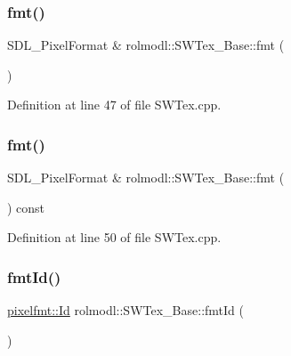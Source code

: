 \subsubsection{\texorpdfstring{fmt()}{fmt()}\hspace{0.1cm}{\footnotesize\ttfamily [1/2]}}
{\footnotesize\ttfamily S\+D\+L\+\_\+\+Pixel\+Format \& rolmodl\+::\+S\+W\+Tex\+\_\+\+Base\+::fmt (\begin{DoxyParamCaption}{ }\end{DoxyParamCaption})\hspace{0.3cm}{\ttfamily [noexcept]}}



Definition at line 47 of file S\+W\+Tex.\+cpp.

\mbox{\label{classrolmodl_1_1_s_w_tex___base_ac8021c7296e412b61f86e86465692213}} 
\subsubsection{\texorpdfstring{fmt()}{fmt()}\hspace{0.1cm}{\footnotesize\ttfamily [2/2]}}
{\footnotesize\ttfamily S\+D\+L\+\_\+\+Pixel\+Format \& rolmodl\+::\+S\+W\+Tex\+\_\+\+Base\+::fmt (\begin{DoxyParamCaption}{ }\end{DoxyParamCaption}) const\hspace{0.3cm}{\ttfamily [noexcept]}}



Definition at line 50 of file S\+W\+Tex.\+cpp.

\mbox{\label{classrolmodl_1_1_s_w_tex___base_ad24ca500f852f0335ae357e3c9ecd90f}} 
\subsubsection{\texorpdfstring{fmtId()}{fmtId()}\hspace{0.1cm}{\footnotesize\ttfamily [1/2]}}
{\footnotesize\ttfamily \mbox{\hyperlink{namespacerolmodl_1_1pixelfmt_a96282713e4465ba9211c8fd3a702b52b}{pixelfmt\+::\+Id}} rolmodl\+::\+S\+W\+Tex\+\_\+\+Base\+::fmt\+Id (\begin{DoxyParamCaption}{ }\end{DoxyParamCaption})\hspace{0.3cm}{\ttfamily [noexcept]}}



